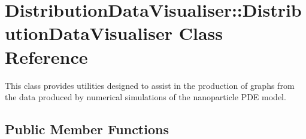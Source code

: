 \hypertarget{class_distribution_data_visualiser_1_1_distribution_data_visualiser}{
\section{DistributionDataVisualiser::DistributionDataVisualiser Class Reference}
\label{class_distribution_data_visualiser_1_1_distribution_data_visualiser}
}


This class provides utilities designed to assist in the production of graphs from the data produced by numerical simulations of the nanoparticle PDE model.  


\subsection*{Public Member Functions}
